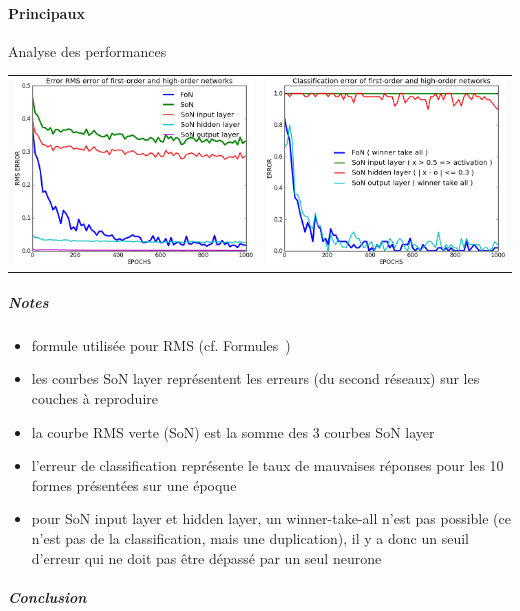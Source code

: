     \paragraph{Principaux}
      Analyse des performances
      \begin{center}
	\begin{tabular}{lr}
	  \hspace*{-1cm}
	  \includegraphics[width=250px]{data/expA3/rms.png}
	  &
	  \includegraphics[width=250px]{data/expA3/err.png} 
	\end{tabular}
      \end{center}
      \subparagraph{Notes}
	\begin{itemize}
	  \item formule utilisée pour RMS (cf. Formules~)
	  \item les courbes SoN layer représentent les erreurs (du second réseaux) sur les couches à reproduire 
	  \item la courbe RMS verte (SoN) est la somme des 3 courbes SoN layer
	  \item l'erreur de classification représente le taux de mauvaises réponses pour les 10 formes présentées sur une époque
	  \item pour SoN input layer et hidden layer, un winner-take-all n'est pas possible (ce n'est pas de la classification, 
	  mais une duplication), il y a donc un seuil d'erreur qui ne doit pas être dépassé par un seul neurone
	\end{itemize}
      \subparagraph{Conclusion}
